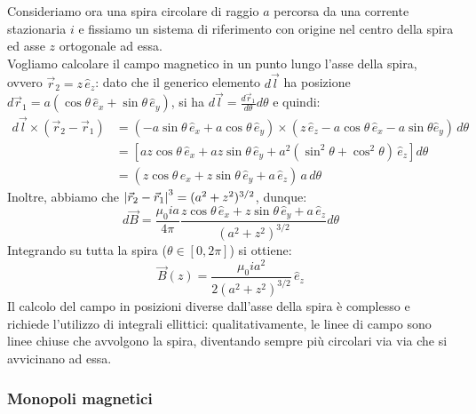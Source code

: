 Consideriamo ora una spira circolare di raggio $ a $ percorsa da una corrente stazionaria $ i $ e fissiamo un sistema di riferimento con origine nel centro della spira ed asse $ z $ ortogonale ad essa. \\ 
%
Vogliamo calcolare il campo magnetico in un punto lungo l'asse della spira, ovvero $ \vec{r}_2 = z \, \hat{e}_z $: dato che il generico elemento $ d\vec{l} $ ha posizione $ d\vec{r}_1 = a (\cos{\theta} \, \hat{e}_x + \sin{\theta} \, \hat{e}_y) $, si ha $ d\vec{l} = \frac{d\vec{r}_1}{d\theta}d\theta $ e quindi:
\begin{equation}
	\begin{split}
		d\vec{l} \times (\vec{r}_2 - \vec{r}_1) &= (-a \sin{\theta} \, \hat{e}_x + a \cos{\theta} \, \hat{e}_y) \times (z \, \hat{e}_z - a \cos{\theta} \, \hat{e}_x - a \sin{\theta} \hat{e}_y) \,d\theta \\ 
							&= \left[ az \cos{\theta} \, \hat{e}_x + az \sin{\theta} \, \hat{e}_y + a^2 (\sin^2{\theta} + \cos^2{\theta}) \, \hat{e}_z \right] d\theta \\ 
							&= (z \cos{\theta} \, \hat{e}_x + z \sin{\theta} \, \hat{e}_y + a \, \hat{e}_z) \, a \, d\theta
	\end{split}
	\label{eq:}
\end{equation}
Inoltre, abbiamo che $ \left\lvert\vec{r}_2 - \vec{r}_1\right\rvert^3 = (a^2 + z^2)^{3/2} $, dunque:
\begin{equation}
	d\vec{B} = \displaystyle\frac{\mu_0 i a}{4\pi} \displaystyle\frac{z \cos{\theta} \, \hat{e}_x + z \sin{\theta} \, \hat{e}_y + a \, \hat{e}_z}{(a^2 + z^2)^{3/2}} d\theta
	\label{eq:}
\end{equation}
Integrando su tutta la spira ($ \theta \in [0, 2\pi] $) si ottiene:
\begin{equation}
	\vec{B}(z) = \displaystyle\frac{\mu_0 i a^2}{2(a^2 + z^2)^{3/2}} \,\hat{e}_z
	\label{eq:mag-spir}
\end{equation}
Il calcolo del campo in posizioni diverse dall'asse della spira è complesso e richiede l'utilizzo di integrali ellittici: qualitativamente, le linee di campo sono linee chiuse che avvolgono la spira, diventando sempre più circolari via via che si avvicinano ad essa.

\subsubsection{Monopoli magnetici}

